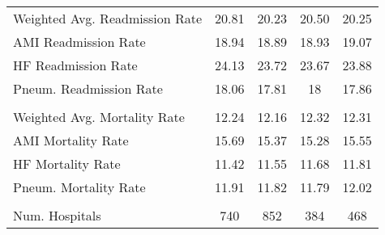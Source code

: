 \begin{table}[ht!]
\begin{tabular}[t]{lcccc}
\hspace{1em}Weighted Avg. Readmission Rate & 20.81 & 20.23 & 20.50 & 20.25\\
\hspace{1em}AMI Readmission Rate & 18.94 & 18.89 & 18.93 & 19.07\\
\hspace{1em}HF Readmission Rate & 24.13 & 23.72 & 23.67 & 23.88\\
\hspace{1em}Pneum. Readmission Rate & 18.06 & 17.81 & 18 & 17.86\\
\addlinespace[0.3em]
\multicolumn{5}{l}{\textbf{Mortality Outcome Variables}}\\
\hspace{1em}Weighted Avg. Mortality Rate & 12.24 & 12.16 & 12.32 & 12.31\\
\hspace{1em}AMI Mortality Rate & 15.69 & 15.37 & 15.28 & 15.55\\
\hspace{1em}HF Mortality Rate & 11.42 & 11.55 & 11.68 & 11.81\\
\hspace{1em}Pneum. Mortality Rate & 11.91 & 11.82 & 11.79 & 12.02\\
\\
Num. Hospitals & 740 & 852 & 384 & 468\\
\bottomrule
\end{tabular}
\end{table}